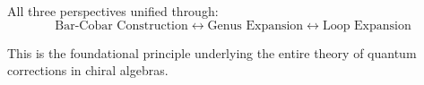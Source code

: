 All three perspectives unified through:
\begin{equation}
\text{Bar-Cobar Construction} \leftrightarrow \text{Genus Expansion} \leftrightarrow \text{Loop Expansion}
\end{equation}

This is the foundational principle underlying the entire theory of quantum corrections in chiral algebras.
